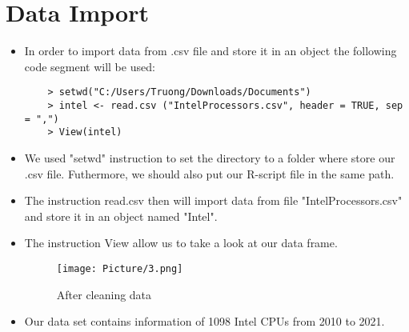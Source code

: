 \documentclass[a4paper]{article}
\begin{document}
\section{Data Import}
\begin{itemize}
    \item[] In order to import data from .csv file and store it in an object the following code segment will be used:
    \begin{lstlisting}
    > setwd("C:/Users/Truong/Downloads/Documents")
    > intel <- read.csv ("IntelProcessors.csv", header = TRUE, sep = ",")
    > View(intel)
    \end{lstlisting}  
    
    \item[] We used "setwd" instruction to set the directory to a folder where store our .csv file.
    Futhermore, we should also put our R-script file in the same path.
    
    \item[] The instruction read.csv then will import data from file "IntelProcessors.csv" and store it in an object named "Intel".
    
    \item[] The instruction View allow us to take a look at our data frame.
    
    \begin{figure}[H]
        \centering
        \texttt{[image: Picture/3.png]}
        \caption{After cleaning data}
        \label{3.1}
    \end{figure}
    
    \item[] Our data set contains information of 1098 Intel CPUs from 2010 to 2021.
\end{itemize}
\end{document}
